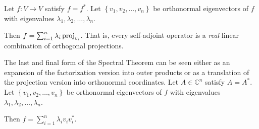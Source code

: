 \begin{lemma}
  Let \(f : V\to V\) satisfy \(f = f^*\).
  Let \(\left\{v_1, v_2, \ldots, v_n\right\}\) be orthonormal eigenvectors of \(f\) with eigenvalues \(\lambda_1, \lambda_2, \ldots, \lambda_n\).


  Then \(f = \sum_{i=1}^n \lambda_i \operatorname{\mathrm{proj}}_{v_i}\).
  That is, every self-adjoint operator is a \emph{real} linear combination of orthogonal projections.
\end{lemma}

\begin{lemma}
The last and final form of the Spectral Theorem can be seen either as an expansion of the factorization version into outer products or as a translation of the projection version into orthonormal coordinates.
  Let \(A \in \mathbb{C}^n\) satisfy \(A = A^*\).
  Let \(\left\{v_1, v_2, \ldots, v_n\right\}\) be orthonormal eigenvectors of \(f\) with eigenvalues \(\lambda_1, \lambda_2, \ldots, \lambda_n\).

  Then \(f = \sum_{i=1}^n \lambda_i v_i v_i^*\).
\end{lemma}


